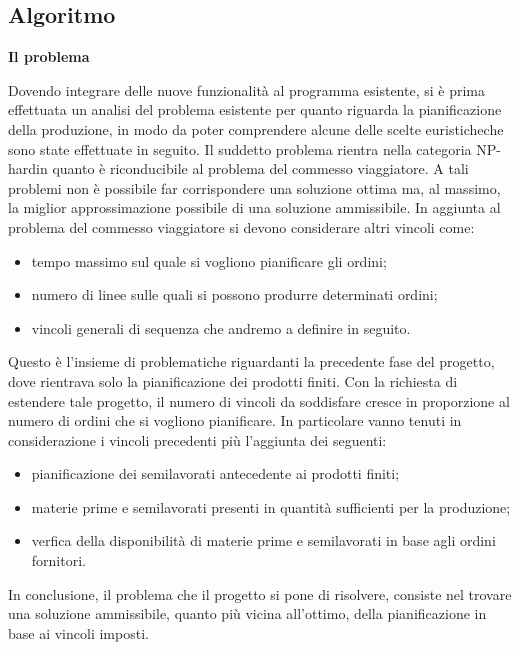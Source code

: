 \subsection{Algoritmo}

\textbf{Il problema}

Dovendo integrare delle nuove funzionalità al programma esistente, si è prima effettuata un analisi del problema esistente per quanto riguarda la pianificazione della produzione,
in modo da poter comprendere alcune delle scelte euristiche\glosp che sono state effettuate in seguito.
Il suddetto problema rientra nella categoria NP-hard\glosp in quanto è riconducibile al problema del commesso viaggiatore\glo. A tali problemi non è possibile far corrispondere
una soluzione ottima ma, al massimo, la miglior approssimazione possibile di una soluzione ammissibile. In aggiunta al problema del commesso viaggiatore si devono considerare
altri vincoli come: 
\begin{itemize}
    \item tempo massimo sul quale si vogliono pianificare gli ordini;
    \item numero di linee sulle quali si possono produrre determinati ordini;
    \item vincoli generali di sequenza che andremo a definire in seguito.
\end{itemize}

Questo è l'insieme di problematiche riguardanti la precedente fase del progetto, dove rientrava solo la pianificazione dei prodotti finiti.
Con la richiesta di estendere tale progetto, il numero di vincoli da soddisfare cresce in proporzione al numero di ordini che si vogliono pianificare.
In particolare vanno tenuti in considerazione i vincoli precedenti più l'aggiunta dei seguenti:

\begin{itemize}
    \item pianificazione dei semilavorati antecedente ai prodotti finiti;
    \item materie prime e semilavorati presenti in quantità sufficienti per la produzione;
    \item verfica della disponibilità di materie prime e semilavorati in base agli ordini fornitori.
\end{itemize}

In conclusione, il problema che il progetto si pone di risolvere, consiste nel trovare una soluzione ammissibile, quanto più vicina all'ottimo,
della pianificazione
in base ai vincoli imposti.\newline

